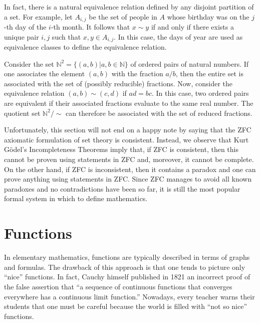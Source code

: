 In fact, there is a natural equivalence relation defined by any disjoint partition of a set.
For example, let $A_{i,j}$ be the set of people in $A$ whose birthday was on the $j$-th day of the $i$-th month.
It follows that $x\sim y$ if and only if there exists a unique pair $i,j$ such that $x,y \in A_{i,j}$.
In this case, the days of year are used as equivalence classes to define the equivalence relation.

\begin{example}
Consider the set $\mathbb{N}^2 = \{ (a,b) | a,b\in\mathbb{N} \}$ of ordered pairs of natural numbers.
If one associates the element $(a,b)$ with the fraction $a/b$, then the entire set is associated with the set of (possibly reducible) fractions.
Now, consider the equivalence relation $(a,b) \sim (c,d)$ if $ad=bc$.
In this case, two ordered pairs are equivalent if their associated fractions evaluate to the same real number.
The quotient set $\mathbb{N}^2 / \!\! \sim$ can therefore be associated with the set of reduced fractions.
\end{example}

Unfortunately, this section will not end on a happy note by saying that the ZFC axiomatic formulation of set theory is consistent.
Instead, we observe that Kurt G\"{o}del's Incompleteness Theorems imply that, if ZFC is consistent, then this cannot be proven using statements in ZFC and, moreover, it cannot be complete.
On the other hand, if ZFC is inconsistent, then it contains a paradox and one can prove anything using statements in ZFC.
Since ZFC manages to avoid all known paradoxes and no contradictions have been so far, it is still the most popular formal system in which to define mathematics.


\section{Functions}

In elementary mathematics, functions are typically described in terms of graphs and formulas.
The drawback of this approach is that one tends to picture only ``nice'' functions.
In fact, Cauchy himself published in 1821 an incorrect proof of the false assertion that ``a sequence of continuous functions that converges everywhere has a continuous limit function.''
Nowadays, every teacher warns their students that one must be careful because the world is filled with ``not so nice'' functions.

